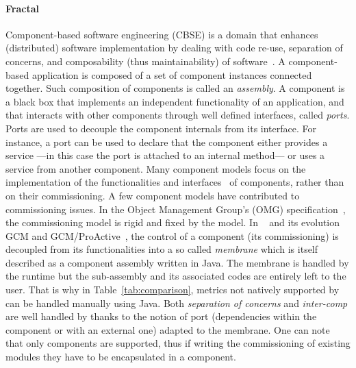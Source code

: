 \paragraph{Fractal}
Component-based software engineering (CBSE) is a domain that enhances (distributed) software implementation by dealing with code re-use, separation of concerns, and composability (thus maintainability) of software~\cite{Szyperski:2002:CSB:515228}. A component-based application is composed of a set of component instances connected together. Such composition of components is called an \emph{assembly}. A component is a black box that implements an independent functionality of an application, and that interacts with
other components through well defined interfaces, called \emph{ports}. Ports are used to decouple the component internals from its interface. For instance, a port can be used to declare that the component either provides a service ---in this case the port is attached to an internal method--- or uses a service from another
component. Many component models focus on the implementation of the functionalities and
interfaces~\cite{corba:omg06,Blair2009,baude:hal-01001043,Bernholdt01052006,bigot:inria-00388508,Coullon2017} of components, rather than on their commissioning. A few component models have contributed to commissioning issues. In the Object
Management Group's (OMG) specification~\cite{ccmdeploy:omg06}, the commissioning model is rigid and fixed by the model. In \fractal~\cite{Blair2009} and its evolution GCM and GCM/ProActive~\cite{baude:hal-01001043}, the control of a component (\eg its commissioning) is decoupled from its functionalities into a
so called \emph{membrane} which is itself described as a component assembly written in Java. The membrane is handled by the \fractal runtime but the sub-assembly and its associated codes are entirely left to the user. That is why in Table~\ref{tab:comparison}, metrics not natively supported by \fractal can be handled manually using Java. Both \emph{separation of concerns} and \emph{inter-comp} are well handled by \fractal thanks to the notion of port (dependencies within the component or with an external one) adapted to the
membrane. One can note that only \fractal components are supported, thus if writing the commissioning of existing modules they have to be encapsulated in a \fractal component.

